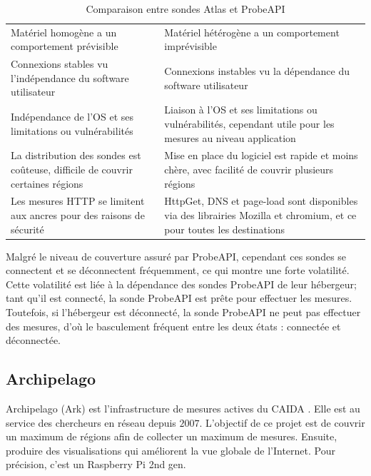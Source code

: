 \begin{table}[H]
	\centering
	\begin{adjustbox}{max width=\textwidth}
		\begin{tabularx}{\textwidth}{|X|X|}
			\hline
			\thead{RIPE Atlas}& \thead{ProbeAPI} \\ \hline
			Matériel homogène a un comportement  prévisible&  Matériel hétérogène a un  comportement imprévisible \\ \hline
			Connexions stables vu l'indépendance du software utilisateur& Connexions instables vu la dépendance du software utilisateur\\ \hline
			Indépendance  de l'OS et ses limitations ou vulnérabilités&  Liaison à l'OS et ses limitations ou vulnérabilités, cependant utile pour les mesures au niveau application \\ \hline
			La distribution des sondes est coûteuse, difficile de couvrir certaines régions&  Mise en place du logiciel est rapide et moins chère, avec facilité de couvrir plusieurs régions\\ \hline
			Les mesures HTTP se limitent aux ancres	pour des raisons de sécurité& HttpGet, DNS et page-load sont disponibles via des librairies Mozilla et chromium, et ce pour toutes les destinations \\ \hline
			
		\end{tabularx}
	\end{adjustbox}
	\caption{Comparaison entre sondes  Atlas et ProbeAPI}
	\label{tab:compare-ripeatlas-probapi}
\end{table}

Malgré le niveau de couverture assuré par ProbeAPI, cependant ces sondes se connectent et se déconnectent fréquemment, ce qui montre une forte volatilité. Cette volatilité est liée à la dépendance des sondes ProbeAPI de leur hébergeur; tant qu'il est connecté, la sonde ProbeAPI est prête pour effectuer les mesures. Toutefois, si l'hébergeur est déconnecté, la sonde ProbeAPI ne peut pas effectuer des mesures, d'où le basculement fréquent entre les deux états : connectée et déconnectée. 


\subsection{Archipelago}

Archipelago (Ark) \cite{Archipelago} est l'infrastructure de mesures actives du CAIDA \cite{CAIDA}. Elle est au service des chercheurs en réseau depuis $2007$. L'objectif de ce projet est de couvrir un maximum de régions afin de collecter un maximum de mesures. Ensuite, produire des visualisations qui améliorent la vue globale de l'Internet. Pour précision, c'est un Raspberry Pi 2nd gen.


